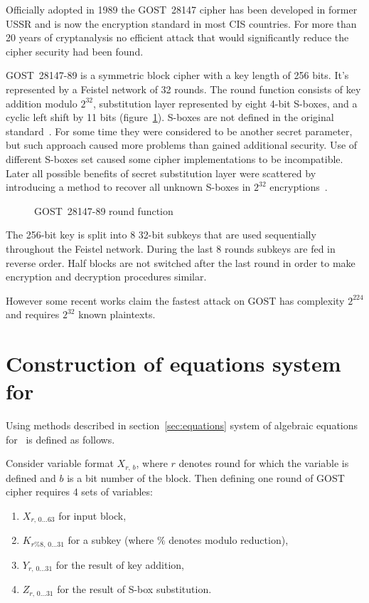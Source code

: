 Officially adopted in 1989 the GOST~28147 cipher has been developed in
former USSR and is now the encryption standard in most CIS countries.
For more than 20 years of cryptanalysis no efficient attack that would
significantly reduce the cipher security had been found. 

GOST~28147-89 is a symmetric block cipher with a key length of 256 bits. It's
represented by a Feistel network of 32 rounds. The round function consists of
key addition modulo $2^{32}$, substitution layer represented by eight 4-bit
S-boxes, and a cyclic left shift by 11 bits (figure~\ref{fig:gost-round-func}). 
S-boxes are not defined in the 
original standard~\cite{GOST28147}. For some time they were considered to be
another secret parameter, but such approach caused more problems than gained
additional security. Use of different S-boxes set caused some cipher
implementations to be incompatible. Later all possible benefits of secret
substitution layer were scattered by introducing a method to recover all
unknown S-boxes in $2^{32}$ encryptions~\cite{saarinen1998:sboxes}.
\begin{figure}[htbp]
    \centering
    
    \caption{GOST~28147-89 round function}
    \label{fig:gost-round-func}
\end{figure}
The 256-bit key is split into 8 32-bit subkeys that are used sequentially
throughout the Feistel network. During the last 8 rounds subkeys are fed in
reverse order. Half blocks are not switched after the last round in order to
make encryption and decryption procedures similar.

However some recent works 
\cite{cryptoeprint-2011-626, Courtois:cryptoeprint_2011} claim the fastest attack on
GOST has complexity $2^{224}$ and requires $2^{32}$ known plaintexts. 

\section{Construction of equations system for \gost}

Using methods described in section~\ref{sec:equations} system of algebraic
equations for \gost\ is defined as follows.

Consider variable format $X_{r, \, b}$, where $r$ denotes round for which the
variable is defined and $b$ is a bit number of the block. Then defining one
round of GOST cipher requires 4 sets of variables: 
\begin{enumerate}
    \item $X_{r, \, 0 \hdots 63}$ for input block, 
    \item $K_{r \% 8, \, 0 \hdots 31}$ for a subkey (where $\%$
        denotes modulo reduction), 
    \item $Y_{r, \, 0 \hdots 31}$ for the result of key addition, 
    \item $Z_{r, \, 0 \hdots 31}$ for the result of S-box substitution. 
\end{enumerate}

